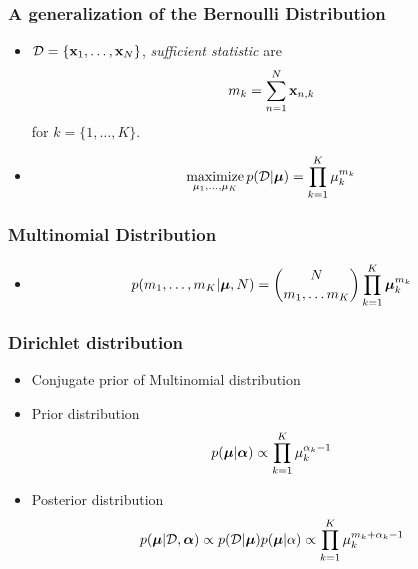 \documentclass[10pt,mathserif]{beamer}
\begin{document}
\begin{frame}
\frametitle{A generalization of the Bernoulli Distribution}
\begin{itemize}\itemsep=12pt
\item $\mathcal{D} = \{\mathbf{x}_1,\ldots,\mathbf{x}_N\}$, \textit{sufficient statistic} are 
\begin{align}
m_k= \sum_{n=1}^N \mathbf{x}_{n,k}\nonumber
\end{align}
for $k=\{1,\ldots,K\}$.

\item
\begin{align}
    \operatorname*{maximize}_{\mu_1,\ldots,\mu_K} p(\mathcal{D}| \boldsymbol{\mu}) = \prod_{k=1}^K \mu_k^{m_k}\nonumber
\end{align}
\end{itemize}
\end{frame}
\begin{frame}
\frametitle{Multinomial Distribution}
\begin{itemize}\itemsep=12pt
\item 
\begin{align}
p(m_1,\ldots,m_K|\boldsymbol{\mu}, N) = {N \choose m_1,\ldots m_K} \prod_{k=1}^K \boldsymbol{\mu}_k^{m_k} \nonumber
\end{align}
\end{itemize}
\end{frame}

\begin{frame}
\frametitle{Dirichlet distribution}
\begin{itemize}\itemsep=12pt
\item Conjugate prior of Multinomial distribution
\item Prior distribution
\begin{align} 
p(\boldsymbol{\mu}| \boldsymbol{\alpha}) \propto \prod_{k=1}^K \mu_k^{\alpha_k-1} \nonumber
\end{align}
\item Posterior distribution
\begin{align} 
p(\boldsymbol{\mu}| \mathcal{D}, \boldsymbol{\alpha}) \propto p(\mathcal{D} | \boldsymbol{\mu})p(\boldsymbol{\mu} | \alpha) \propto \prod_{k=1}^K \mu_k^{m_k+\alpha_k-1} \nonumber
\end{align}
\end{itemize}
\end{frame}
\end{document}
